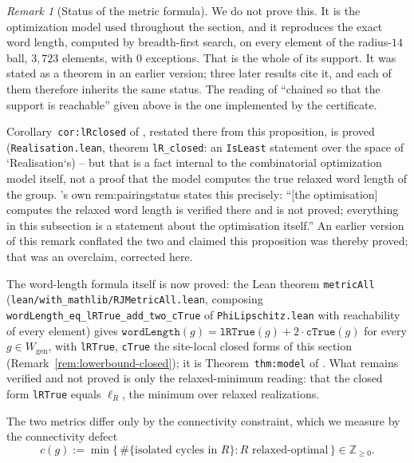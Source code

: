 \documentclass[11pt]{article}
\theoremstyle{plain}
\theoremstyle{definition}
\theoremstyle{remark}
\newtheorem{remark}[theorem]{Remark}
\begin{document}
\begin{remark}[Status of the metric formula]
\label{rem:metric-formula-status}
We do not prove this. It is the optimization model used throughout the section,
and it reproduces the exact word length, computed by breadth-first search, on
every element of the radius-$14$ ball, $3{,}723$ elements, with $0$ exceptions.
That is the whole of its support. It was stated as a theorem in an earlier
version; three later results cite it, and each of them therefore inherits the
same status. The reading of ``chained so that the support is reachable'' given
above is the one implemented by the certificate.

Corollary~\texttt{cor:lRclosed} of \cite{Bonfioli2026b}, restated there from
this proposition, is proved (\texttt{Realisation.lean}, theorem
\texttt{lR\_closed}: an \texttt{IsLeast} statement over the space of
`Realisation`s) -- but that is a fact internal to the combinatorial
optimization model itself, not a proof that the model computes the true
relaxed word length of the group. \cite{Bonfioli2026b}'s own
\textup{rem:pairingstatus} states this precisely: ``[the optimisation]
computes the relaxed word length is verified there and is not proved;
everything in this subsection is a statement about the optimisation itself.''
An earlier version of this remark conflated the two and claimed this
proposition was thereby proved; that was an overclaim, corrected here.

The word-length formula itself is now proved: the Lean theorem
\texttt{metricAll} (\texttt{lean/with\_mathlib/RJMetricAll.lean}, composing
\texttt{wordLength\_eq\_lRTrue\_add\_two\_cTrue} of \texttt{PhiLipschitz.lean}
with reachability of every element) gives
$\texttt{wordLength}(g)=\texttt{lRTrue}(g)+2\cdot\texttt{cTrue}(g)$ for every
$g\in W_{\mathrm{gen}}$, with \texttt{lRTrue}, \texttt{cTrue} the site-local
closed forms of this section (Remark~\ref{rem:lowerbound-closed}); it is
Theorem~\texttt{thm:model} of \cite{Bonfioli2026b}. What remains verified and
not proved is only the relaxed-minimum reading: that the closed form
\texttt{lRTrue} equals $\ell_R$, the minimum over relaxed realizations.
\end{remark}

The two metrics differ only by the connectivity constraint, which we measure by
the connectivity defect
\[
c(g):=\min\bigl\{\,\#\{\text{isolated cycles in }R\}
: R\text{ relaxed-optimal}\,\bigr\}\in\mathbb{Z}_{\ge0}.
\]
\end{document}
